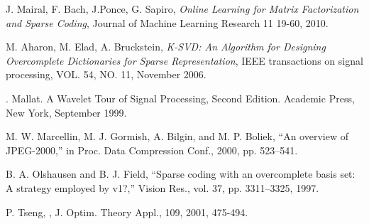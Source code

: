 \documentclass[a4paper,11pt]{article}
\begin{document}
\begin{thebibliography}{9}
  J. Mairal, F. Bach, J.Ponce, G. Sapiro,
  \emph{Online Learning for Matrix Factorization and Sparse Coding},
  Journal of Machine Learning Research 11 19-60, 2010.

  M. Aharon, M. Elad, A. Bruckstein,
  \emph{K-SVD: An Algorithm for Designing Overcomplete Dictionaries for Sparse Representation},
  IEEE transactions on signal processing, VOL. 54, NO. 11, November 2006.

. Mallat. A Wavelet Tour of Signal Processing, Second Edition. Academic Press, New York,
September 1999.


M. W. Marcellin, M. J. Gormish, A. Bilgin, and M. P. Boliek, “An
overview of JPEG-2000,” in Proc. Data Compression Conf., 2000, pp.
523–541.

B. A. Olshausen and B. J. Field, “Sparse coding with an overcomplete
basis set: A strategy employed by v1?,” Vision Res., vol. 37, pp.
3311–3325, 1997.



P. Tseng, , J. Optim. Theory Appl., 109, 2001, 475-494.

\end{thebibliography}
\end{document}
